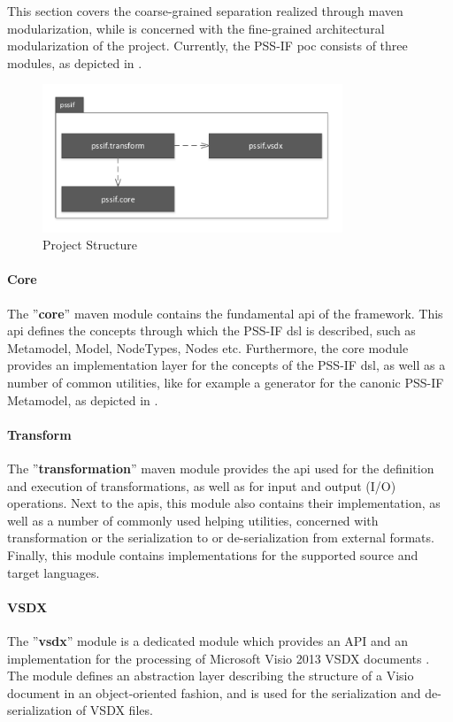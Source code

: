 This section covers the coarse-grained separation realized through maven modularization, while  is concerned with the fine-grained architectural modularization of the project. Currently, the PSS-IF \gls{poc} consists of three modules, as depicted in  .

\begin{figure}
\centering
\includegraphics[width=0.8\textwidth]{figures/project-structure.pdf}
\caption{Project Structure}
\label{fig:structure}
\end{figure}

\paragraph{Core} The ''\textbf{core}'' maven module contains the fundamental \gls{api} of the framework. This \gls{api} defines the concepts through which the PSS-IF \gls{dsl} is described, such as Metamodel, Model, NodeTypes, Nodes etc. Furthermore, the core module provides an implementation layer for the concepts of the PSS-IF \gls{dsl}, as well as a number of common utilities, like for example a generator for the canonic PSS-IF Metamodel, as depicted in .

\paragraph{Transform} The ''\textbf{transformation}'' maven module provides the \gls{api} used for the definition and execution of transformations, as well as for input and output (I/O) operations. Next to the \glspl{api}, this module also contains their implementation, as well as a number of commonly used helping utilities, concerned with transformation or the serialization to or de-serialization from external formats. Finally, this module contains implementations for the supported source and target languages.

\paragraph{VSDX} The ''\textbf{vsdx}'' module is a dedicated module which provides an API and an implementation for the processing of Microsoft Visio 2013 VSDX documents \cite{ref:visio}. The module defines an abstraction layer describing the structure of a Visio document in an object-oriented fashion, and is used for the serialization and de-serialization of VSDX files.

